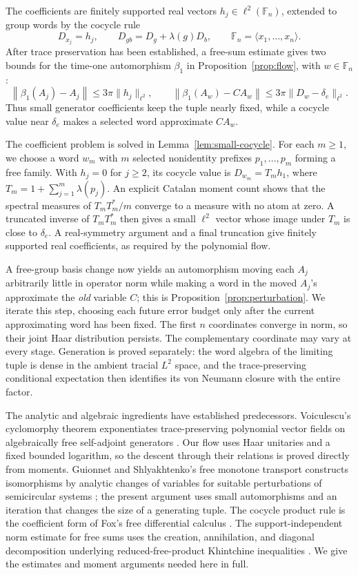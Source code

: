 \documentclass[11pt]{article}
\numberwithin{equation}{section}
\theoremstyle{definition}
\theoremstyle{remark}
\newcommand{\F}{\mathbb F}
\newcommand{\norm}[1]{\left\lVert #1\right\rVert}
\begin{document}
The coefficients are finitely supported real vectors $h_j\in\ell^2(\F_n)$, extended to group words by the cocycle rule
\[
 D_{x_j}=h_j,\qquad D_{gb}=D_g+\lambda(g)D_b,
 \qquad \F_n=\langle x_1,\ldots,x_n\rangle.
\]
After trace preservation has been established, a free-sum estimate gives two bounds for the time-one automorphism $\beta_1$ in Proposition~\ref{prop:flow}, with $w\in\F_n$:
\[
 \norm{\beta_1(A_j)-A_j}\leq3\pi\|h_j\|_{\ell^2},\qquad
 \norm{\beta_1(A_w)-CA_w}\leq3\pi\|D_w-\delta_e\|_{\ell^2}.
\]
Thus small generator coefficients keep the tuple nearly fixed, while a cocycle value near $\delta_e$ makes a selected word approximate $CA_w$.

The coefficient problem is solved in Lemma~\ref{lem:small-cocycle}. For each $m\geq1$, we choose a word $w_m$ with $m$ selected nonidentity prefixes $p_1,\ldots,p_m$ forming a free family. With $h_j=0$ for $j\geq2$, its cocycle value is $D_{w_m}=T_mh_1$, where $T_m=1+\sum_{j=1}^m\lambda(p_j)$. An explicit Catalan moment count shows that the spectral measures of $T_mT_m^*/m$ converge to a measure with no atom at zero. A truncated inverse of $T_mT_m^*$ then gives a small $\ell^2$ vector whose image under $T_m$ is close to $\delta_e$. A real-symmetry argument and a final truncation give finitely supported real coefficients, as required by the polynomial flow.

A free-group basis change now yields an automorphism moving each $A_j$ arbitrarily little in operator norm while making a word in the moved $A_j$'s approximate the \emph{old} variable $C$; this is Proposition~\ref{prop:perturbation}. We iterate this step, choosing each future error budget only after the current approximating word has been fixed. The first $n$ coordinates converge in norm, so their joint Haar distribution persists. The complementary coordinate may vary at every stage. Generation is proved separately: the word algebra of the limiting tuple is dense in the ambient tracial $L^2$ space, and the trace-preserving conditional expectation then identifies its von Neumann closure with the entire factor.

The analytic and algebraic ingredients have established predecessors. Voiculescu's cyclomorphy theorem exponentiates trace-preserving polynomial vector fields on algebraically free self-adjoint generators \cite[Theorem~3.8]{voiculescu2002cyclomorphy}. Our flow uses Haar unitaries and a fixed bounded logarithm, so the descent through their relations is proved directly from moments. Guionnet and Shlyakhtenko's free monotone transport constructs isomorphisms by analytic changes of variables for suitable perturbations of semicircular systems \cite{guionnet_shlyakhtenko2014}; the present argument uses small automorphisms and an iteration that changes the size of a generating tuple. The cocycle product rule is the coefficient form of Fox's free differential calculus \cite[\S1, equation~$(1.2)'$]{fox1953}. The support-independent norm estimate for free sums uses the creation, annihilation, and diagonal decomposition underlying reduced-free-product Khintchine inequalities \cite[\S2]{ricard_xu2006}. We give the estimates and moment arguments needed here in full.
\end{document}
